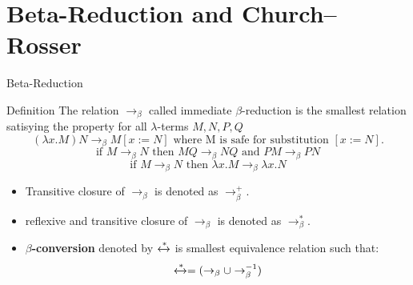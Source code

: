 \documentclass{beamer}
\begin{document}
  
  
  

\section{Beta-Reduction and Church–Rosser}
\begin{frame}{Beta-Reduction}
  \begin{block}{Definition}
    The relation \(\rightarrow_\beta\) called immediate $\beta$-reduction is the smallest relation satisying the property for all $\lambda$-terms \(M,N,P,Q\)
    \[
      (\lambda x.M)N \rightarrow_\beta M[x := N] \text{ where M is safe for substitution \([x := N]\).}
    \]
    \[
      \text{if } M \rightarrow_\beta N \text{ then } MQ \rightarrow_\beta NQ \text{ and } PM \rightarrow_\beta PN
    \]
    \[
      \text{if } M \rightarrow_\beta N \text{ then } \lambda x.M \rightarrow_\beta \lambda x.N
    \]
  \end{block}
  \begin{itemize}
    \item Transitive closure of $\rightarrow_\beta$ is denoted as $\rightarrow^+_\beta$.
    \item reflexive and transitive closure of $\rightarrow_\beta$ is denoted as $\rightarrow^*_\beta$.
    \item \textbf{\(\beta\)-conversion} denoted by $\xleftrightarrow{*}$ is smallest equivalence relation such that:
      \[
        \xleftrightarrow{*} = (\rightarrow_\beta \cup \rightarrow_\beta^{-1})
      \]
  \end{itemize}
  

\end{frame}
\end{document}
